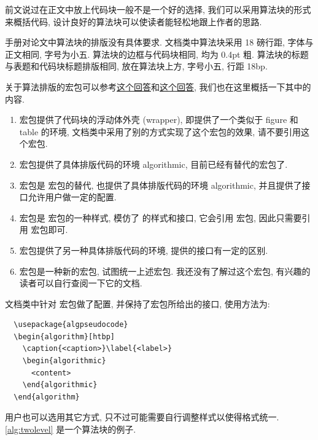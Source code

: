 前文说过在正文中放上代码块一般不是一个好的选择, 我们可以采用算法块的形式来概括代码, 设计良好的算法块可以使读者能轻松地跟上作者的思路.

手册对论文中算法块的排版没有具体要求. 文档类中算法块采用 18 磅行距, 字体与正文相同, 字号为小五. 算法块的边框与代码块相同, 均为 0.4pt 粗. 算法块的标题与表题和代码块标题排版相同, 放在算法块上方, 字号小五, 行距 18bp.

关于算法排版的宏包可以参考\href{https://tex.stackexchange.com/a/230789/}{这个回答}和\href{https://tex.stackexchange.com/a/594570/}{这个回答}, 我们也在这里概括一下其中的内容.
\begin{enumerate}
  \item {} 宏包提供了代码块的浮动体外壳 (wrapper), 即提供了一个类似于 figure 和 table 的环境, 文档类中采用了别的方式实现了这个宏包的效果, 请不要引用这个宏包.
  \item {} 宏包提供了具体排版代码的环境 algorithmic, 目前已经有替代的宏包了.
  \item {} 宏包是  宏包的替代, 也提供了具体排版代码的环境 algorithmic, 并且提供了接口允许用户做一定的配置.
  \item {} 宏包是  宏包的一种样式, 模仿了  的样式和接口, 它会引用  宏包, 因此只需要引用  宏包即可.
  \item {} 宏包提供了另一种具体排版代码的环境, 提供的接口有一定的区别.
  \item {} 宏包是一种新的宏包, 试图统一上述宏包. 我还没有了解过这个宏包, 有兴趣的读者可以自行查阅一下它的文档.
\end{enumerate}

文档类中针对  宏包做了配置, 并保持了宏包所给出的接口, 使用方法为:
\begin{verbatim}
  \usepackage{algpseudocode}
  \begin{algorithm}[htbp]
    \caption{<caption>}\label{<label>}
    \begin{algorithmic}
      <content>
    \end{algorithmic}
  \end{algorithm}
\end{verbatim}
用户也可以选用其它方式, 只不过可能需要自行调整样式以使得格式统一. \ref{alg:twolevel} 是一个算法块的例子.

